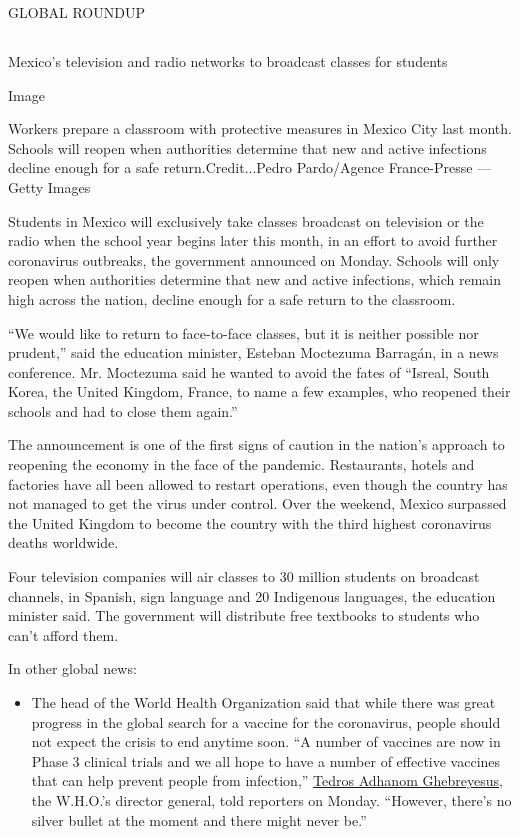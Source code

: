 GLOBAL ROUNDUP

\hypertarget{-11}{%
\subsection{}\label{-11}}

Mexico's television and radio networks to broadcast classes for students

Image

Workers prepare a classroom with protective measures in Mexico City last
month. Schools will reopen when authorities determine that new and
active infections decline enough for a safe return.Credit...Pedro
Pardo/Agence France-Presse --- Getty Images

Students in Mexico will exclusively take classes broadcast on television
or the radio when the school year begins later this month, in an effort
to avoid further coronavirus outbreaks, the government announced on
Monday. Schools will only reopen when authorities determine that new and
active infections, which remain high across the nation, decline enough
for a safe return to the classroom.

``We would like to return to face-to-face classes, but it is neither
possible nor prudent,'' said the education minister, Esteban Moctezuma
Barragán, in a news conference. Mr. Moctezuma said he wanted to avoid
the fates of ``Isreal, South Korea, the United Kingdom, France, to name
a few examples, who reopened their schools and had to close them
again.''

The announcement is one of the first signs of caution in the nation's
approach to reopening the economy in the face of the pandemic.
Restaurants, hotels and factories have all been allowed to restart
operations, even though the country has not managed to get the virus
under control. Over the weekend, Mexico surpassed the United Kingdom to
become the country with the third highest coronavirus deaths worldwide.

Four television companies will air classes to 30 million students on
broadcast channels, in Spanish, sign language and 20 Indigenous
languages, the education minister said. The government will distribute
free textbooks to students who can't afford them.

In other global news:

\begin{itemize}
\tightlist
\item
  The head of the World Health Organization said that while there was
  great progress in the global search for a vaccine for the coronavirus,
  people should not expect the crisis to end anytime soon. ``A number of
  vaccines are now in Phase 3 clinical trials and we all hope to have a
  number of effective vaccines that can help prevent people from
  infection,'' \href{https://twitter.com/DrTedros}{Tedros Adhanom
  Ghebreyesus}, the W.H.O.'s director general, told reporters on Monday.
  ``However, there's no silver bullet at the moment and there might
  never be.''
\end{itemize}

